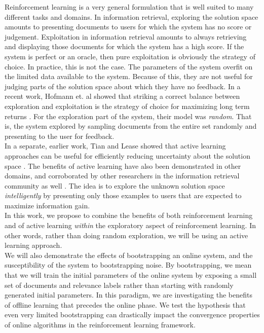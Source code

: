 \documentclass{acm_proc_article-sp}
\begin{document}
Reinforcement learning is a very general formulation that is well suited to many different tasks and domains. In information retrieval, exploring the solution space amounts to presenting documents to users for which the system has no score or judgement. Exploitation in information retrieval amounts to always retrieving and displaying those documents for which the system has a high score. If the system is perfect or an oracle, then pure exploitation is obviously the strategy of choice. In practice, this is not the case. The parameters of the system overfit on the limited data available to the system. Because of this, they are not useful for judging parts of the solution space about which they have no feedback. In a recent work, Hofmann et. al showed that striking a correct balance between exploration and exploitation is the strategy of choice for maximizing long term returns \cite{hofmann}. For the exploration part of the system, their model was \emph{random}. That is, the system explored by sampling documents from the entire set randomly and presenting to the user for feedback. \\
In a separate, earlier work, Tian and Lease showed that active learning approaches can be useful for efficiently reducing uncertainty about the solution space \cite{aibo}. The benefits of active learning have also been demonstrated in other domains, and corroborated by other researchers in the information retrieval community as well \cite{active2}. The idea is to explore the unknown solution space \emph{intelligently} by presenting only those examples to users that are expected to maximize information gain. \\
In this work, we propose to combine the benefits of both reinforcement learning and of active learning \emph{within} the exploratory aspect of reinforcement learning. In other words, rather than doing random exploration, we will be using an active learning approach. \\
We will also demonstrate the effects of bootstrapping an online system, and the susceptibility of the system to bootstrapping noise. By bootstrapping, we mean that we will train the initial parameters of the online system by exposing a small set of documents and relevance labels rather than starting with randomly generated initial parameters. In this paradigm, we are investigating the benefits of offline learning that precedes the online phase. We test the hypothesis that even very limited bootstrapping can drastically impact the convergence properties of online algorithms in the reinforcement learning framework. 
\end{document}
